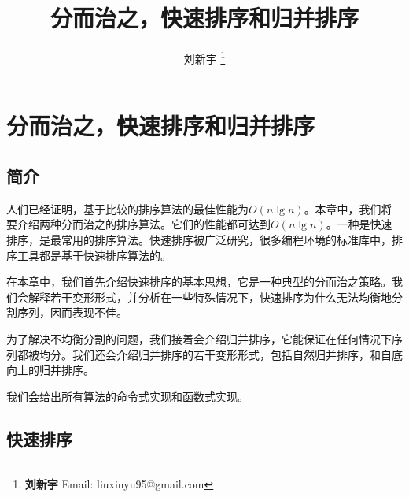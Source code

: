 \documentclass[UTF8]{article}
\begin{document}


\title{分而治之，快速排序和归并排序}

\author{刘新宇
\thanks{{\bfseries 刘新宇 } \newline
  Email: liuxinyu95@gmail.com \newline}
  }

\maketitle
\fi


\ifx\wholebook\relax
\chapter{分而治之，快速排序和归并排序}
\fi

\section{简介}
\label{introduction}

人们已经证明，基于比较的排序算法的最佳性能为$O(n \lg n)$\cite{TAOCP}。本章中，我们将要介绍两种分而治之的排序算法。它们的性能都可达到$O(n \lg n)$。一种是快速排序，是最常用的排序算法。快速排序被广泛研究，很多编程环境的标准库中，排序工具都是基于快速排序算法的。

在本章中，我们首先介绍快速排序的基本思想，它是一种典型的分而治之策略。我们会解释若干变形形式，并分析在一些特殊情况下，快速排序为什么无法均衡地分割序列，因而表现不佳。

为了解决不均衡分割的问题，我们接着会介绍归并排序，它能保证在任何情况下序列都被均分。我们还会介绍归并排序的若干变形形式，包括自然归并排序，和自底向上的归并排序。

我们会给出所有算法的命令式实现和函数式实现。

\section{快速排序}
\end{document}
